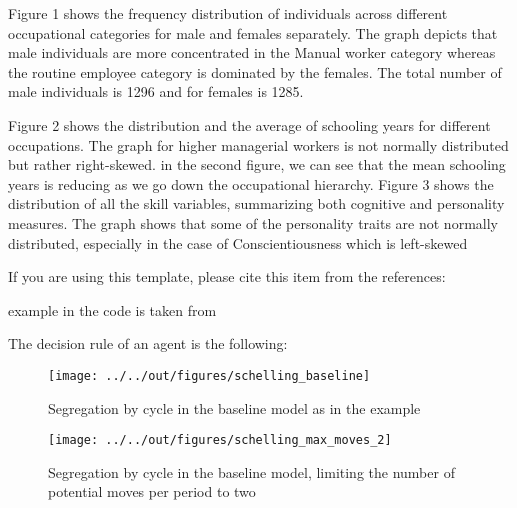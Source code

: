 \documentclass[11pt, a4paper, leqno]{article}
\begin{document}
Figure 1 shows the frequency distribution of individuals across different occupational categories for male and females separately. The graph depicts that male individuals are more concentrated in the Manual worker category whereas the routine employee category is dominated by the females. The total number of male individuals is 1296 and for females is 1285. \par
Figure 2 shows the distribution and the average of schooling years for different occupations. The graph for higher managerial workers is not normally distributed but rather right-skewed. in the second figure, we can see that the mean schooling years is reducing as we go down the occupational hierarchy. 
Figure 3 shows the distribution  of all the skill variables, summarizing both cognitive and personality measures. The graph shows that some of the personality traits are not normally distributed, especially in the case of Conscientiousness which is left-skewed

If you are using this template, please cite this item from the references: \citet{GaudeckerEconProjectTemplates}

\citet{Schelling69} example in the code is taken from \citet{StachurskiSargent13}

The decision rule of an agent is the following:


\begin{figure}
    \caption{Segregation by cycle in the baseline \citet{Schelling69} model as in the \citet{StachurskiSargent13} example}
    
    \texttt{[image: ../../out/figures/schelling\_baseline]}

\end{figure}


\begin{figure}
    \caption{Segregation by cycle in the baseline \citet{Schelling69} model, limiting the number of potential moves per period to two}
    
    \texttt{[image: ../../out/figures/schelling\_max\_moves\_2]}

\end{figure}





\printbibliography
{}





\end{document}
